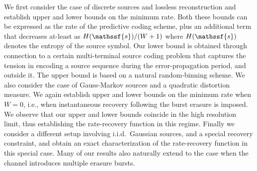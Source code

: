 \documentclass[journal, twocolumn, 10pt]{IEEEtran}
\newcommand{\rvs}{{\mathssf{s}}}    %
\begin{document}
We first consider the case of discrete sources and lossless reconstruction and establish  upper and lower bounds on the minimum rate. Both these bounds can be expressed as the rate of the predictive coding scheme, plus an additional term that decreases at-least as $H(\rvs)/(W+1)$ where $H(\rvs)$ denotes the entropy of the source symbol.  Our lower bound is obtained through connection to a certain multi-terminal source coding problem that captures the tension in encoding a source sequence during the error-propagation period, and outside it. The upper bound is based on a natural random-binning scheme. We also consider the  case of Gauss-Markov sources and a quadratic distortion measure. We again establish upper and lower bounds on the minimum rate when $W=0$, i.e., when instantaneous recovery following the burst erasure is imposed. We observe that our upper and lower bounds coincide in the high resolution limit, thus establishing the rate-recovery function in this regime. Finally we consider a different setup involving i.i.d.\ Gaussian sources, and a special recovery constraint, and obtain an exact characterization of the  rate-recovery function in this special case.  Many of our results also naturally extend to the case when the channel introduces multiple erasure bursts.
\end{document}

